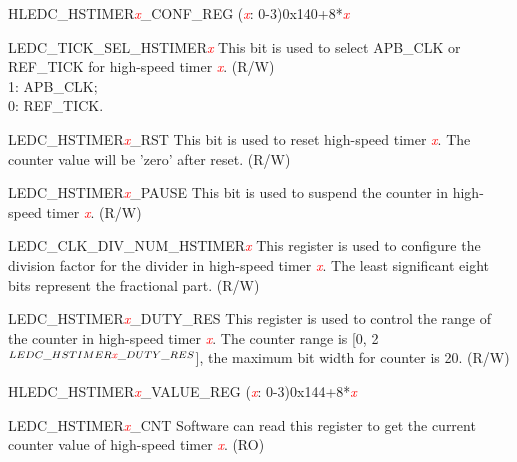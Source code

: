 \begin{register}{H}{LEDC\_HSTIMER\textcolor{red}{\it{x}}\_CONF\_REG (\textcolor{red}{\it{x}}: 0-3)}{0x140+8*\textcolor{red}{\it{x}}}\label{regdesc:LEDCHSTIMERnCONFREG}
%
%
%
%
%
%
\regnewline%
\begin{regdesc}\begin{reglist}
\item [LEDC\_TICK\_SEL\_HSTIMER\textcolor{red}{\it{x}}]This bit is used to select APB\_CLK or REF\_TICK for high-speed timer \textcolor{red}{\it{x}}. (R/W) \\1: APB\_CLK;  \\0: REF\_TICK.
\item [LEDC\_HSTIMER\textcolor{red}{\it{x}}\_RST]This bit is used to reset high-speed timer \textcolor{red}{\it{x}}. The counter value will be 'zero' after reset. (R/W)
\item [LEDC\_HSTIMER\textcolor{red}{\it{x}}\_PAUSE]This bit is used to suspend the counter in high-speed timer \textcolor{red}{\it{x}}. (R/W)
\item [LEDC\_CLK\_DIV\_NUM\_HSTIMER\textcolor{red}{\it{x}}]This register is used to configure the division factor for the divider in high-speed timer \textcolor{red}{\it{x}}. The least significant eight bits represent the fractional part. (R/W)
\item [LEDC\_HSTIMER\textcolor{red}{\it{x}}\_DUTY\_RES]This register is used to control the range of the counter in high-speed timer \textcolor{red}{\it{x}}. The counter range is [0, 2$ ^{LEDC\_HSTIMER\textcolor{red}{\it{x}}\_DUTY\_RES}$], the maximum bit width for counter is 20. (R/W)
\end{reglist}\end{regdesc}
\end{register}


\begin{register}{H}{LEDC\_HSTIMER\textcolor{red}{\it{x}}\_VALUE\_REG (\textcolor{red}{\it{x}}: 0-3)}{0x144+8*\textcolor{red}{\it{x}}}\label{regdesc:LEDCHSTIMERnVALUEREG}
%
%
\regnewline%
\begin{regdesc}\begin{reglist}
\item [LEDC\_HSTIMER\textcolor{red}{\it{x}}\_CNT]Software can read this register to get the current counter value of high-speed timer \textcolor{red}{\it{x}}. (RO)
\end{reglist}\end{regdesc}
\end{register}



